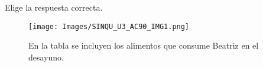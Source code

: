 Elige la respuesta correcta.

\begin{figure}[h]
    \centering
    \texttt{[image: Images/SINQU\_U3\_AC90\_IMG1.png]}
    \caption{En la tabla se incluyen los alimentos que consume Beatriz en el desayuno.}
\end{figure}

\begin{parts}
    
    
    
    
    
\end{parts}